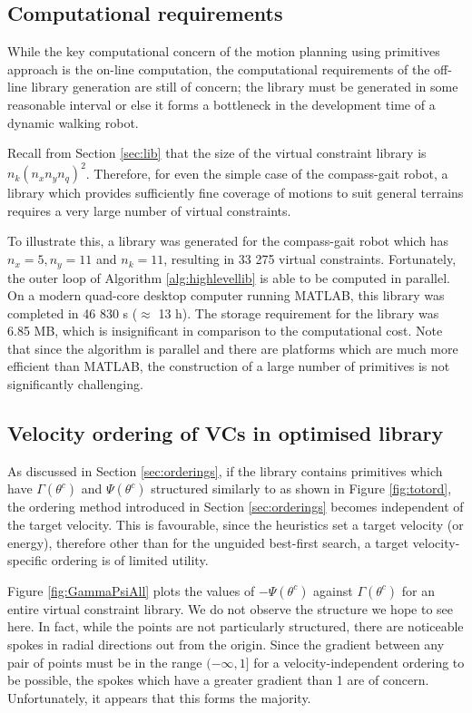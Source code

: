 \subsection{Computational requirements} \label{sec:vcgenres}
While the key computational concern of the motion planning using primitives approach is the on-line computation, the computational requirements of the off-line library generation are still of concern; the library must be generated in some reasonable interval or else it forms a bottleneck in the development time of a dynamic walking robot.

Recall from Section \ref{sec:lib} that the size of the virtual constraint library is $n_k(n_xn_yn_q)^2$. Therefore, for even the simple case of the compass-gait robot, a library which provides sufficiently fine coverage of motions to suit general terrains requires a very large number of virtual constraints.

To illustrate this, a library was generated for the compass-gait robot which has $n_x=5,n_y=11$ and $n_k=11$, resulting in 33 275 virtual constraints. Fortunately, the outer loop of Algorithm \ref{alg:highlevellib} is able to be computed in parallel. On a modern quad-core desktop computer running MATLAB, this library was completed in 46 830 s ($\approx$ 13 h). The storage requirement for the library was 6.85 MB, which is insignificant in comparison to the computational cost. Note that since the algorithm is parallel and there are platforms which are much more efficient than MATLAB, the construction of a large number of primitives is not significantly challenging.

\subsection{Velocity ordering of VCs in optimised library}
As discussed in Section \ref{sec:orderings}, if the library contains primitives which have $\Gamma(\theta^c)$ and $\Psi(\theta^c)$ structured similarly to as shown in Figure \ref{fig:totord}, the ordering method introduced in Section \ref{sec:orderings} becomes independent of the target velocity. This is favourable, since the heuristics set a target velocity (or energy), therefore other than for the unguided best-first search, a target velocity-specific ordering is of limited utility.

Figure \ref{fig:GammaPsiAll} plots the values of $-\Psi(\theta^c)$ against $\Gamma(\theta^c)$ for an entire virtual constraint library. We do not observe the structure we hope to see here. In fact, while the points are not particularly structured, there are noticeable spokes in radial directions out from the origin. Since the gradient between any pair of points must be in the range $(-\infty,1]$ for a velocity-independent ordering to be possible, the spokes which have a greater gradient than 1 are of concern. Unfortunately, it appears that this forms the majority.

